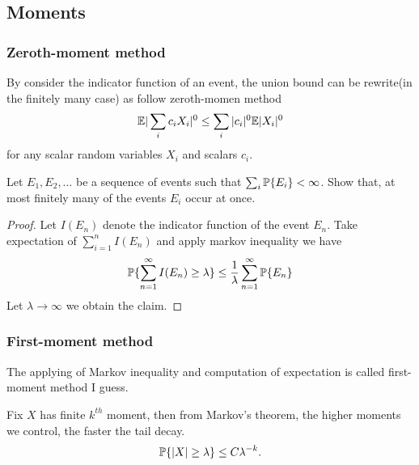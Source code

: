 \subsection{Moments}

\subsubsection{Zeroth-moment method}

By consider the indicator function of an event, the union bound can be rewrite(in the finitely many case) as follow zeroth-momen method
\begin{equation}
    \mathbb{E} |\sum_i c_i X_i|^0 \leq \sum_i |c_i|^0 \mathbb{E} |X_i|^0
\end{equation}
for any  scalar random variables $X_i$ and scalars $c_i$.

\begin{lemma}
    \label{Borel Cantelli lemma}
    Let $E_1,E_2,\dots$ be a sequence of events such that $\sum_{i} \mathbb{P} \{E_i\} <\infty$. Show that, at most finitely many of the events $E_i$ occur at once.
\end{lemma}

\begin{proof}
    Let $I(E_n)$ denote the indicator function of the event $E_n$. Take expectation of $\sum_{i=1}^n I(E_n) $ and apply markov inequality we have 
    \begin{equation*}
        \mathbb{P} \{\sum_{n=1}^\infty I(E_n)\geq \lambda \} \leq \frac{1}{\lambda} \sum_{n=1}^\infty \mathbb{P}\{E_n\}
    \end{equation*}
    Let $\lambda\to \infty$ we obtain the claim.
\end{proof}

\subsubsection{First-moment method}

The applying of Markov inequality and computation of expectation is called first-moment method I guess.

Fix $X$ has finite $k^{th}$ moment, then from Markov's theorem, the higher moments we control, the faster the tail decay.
\begin{equation}
    \mathbb{P} \{ |X|\geq \lambda\} \leq C\lambda^{-k}.
\end{equation}


